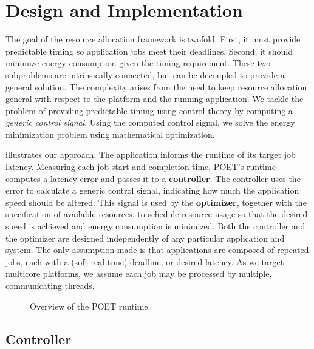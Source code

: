 \section{Design and Implementation}
\label{sec:poet-framework}

The goal of the resource allocation framework is twofold. 
First, it must provide predictable timing so application jobs meet their deadlines.
Second, it should minimize energy consumption given the timing requirement.
These two subproblems are intrinsically connected, but can be decoupled to provide a general solution.
The complexity arises from the need to keep resource allocation general with respect to the platform and the running application.
We tackle the problem of providing predictable timing using control theory by computing a \emph{generic control signal}.
Using the computed control signal, we solve the energy minimization problem using mathematical optimization.

 illustrates our approach.
The application informs the runtime of its target job latency.
Measuring each job start and completion time, POET's runtime computes a latency error and passes it to a \textbf{controller}.
The controller uses the error to calculate a generic control signal, indicating how much the application speed should be altered.
This signal is used by the \textbf{optimizer}, together with the specification of available resources, to schedule resource usage so that the desired speed is achieved and energy consumption is minimized.
Both the controller and the optimizer are designed independently of any particular application and system.
The only assumption made is that applications are composed of repeated jobs, each with a (soft real-time) deadline, or desired latency.
As we target multicore platforms, we assume each job may be processed by multiple, communicating threads.

\begin{figure}[t]
  \centering
  
  \caption{Overview of the POET runtime.}
  \label{fig:poet-runtime}
\end{figure}


\subsection{Controller}

